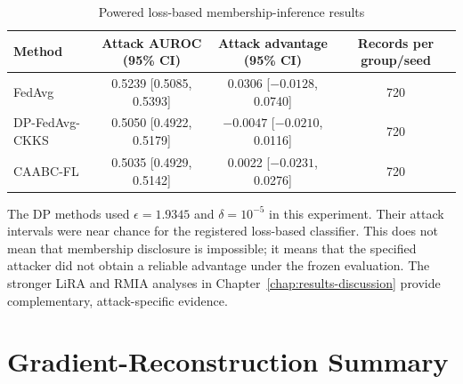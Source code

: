 \begin{table}[htbp]
    \centering
    \caption{Powered loss-based membership-inference results}
    \label{tab:membership-appendix}
    \begin{tabular}{@{}lccc@{}}
        \toprule
        Method & Attack AUROC (95\% CI) & Attack advantage (95\% CI) & Records per group/seed \\
        \midrule
        FedAvg & 0.5239 [0.5085, 0.5393] & 0.0306 [$-0.0128$, 0.0740] & 720 \\
        DP-FedAvg-CKKS & 0.5050 [0.4922, 0.5179] & $-0.0047$ [$-0.0210$, 0.0116] & 720 \\
        CAABC-FL & 0.5035 [0.4929, 0.5142] & 0.0022 [$-0.0231$, 0.0276] & 720 \\
        \bottomrule
    \end{tabular}
\end{table}

The DP methods used $\epsilon=1.9345$ and $\delta=10^{-5}$ in this experiment. Their attack intervals were near chance for the registered loss-based classifier. This does not mean that membership disclosure is impossible; it means that the specified attacker did not obtain a reliable advantage under the frozen evaluation. The stronger LiRA and RMIA analyses in Chapter~\ref{chap:results-discussion} provide complementary, attack-specific evidence.

\section{Gradient-Reconstruction Summary}
\label{appsec:gradient-full}

\begin{table}[htbp]
    \centering
    \caption{Three-hundred-step gradient-reconstruction results}
    \label{tab:gradient-appendix}
\end{table}

